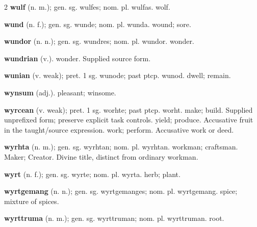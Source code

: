 \begin{multicols*}{2}
\textbf{wulf} (n. m.); gen. sg. wulfes; nom. pl. wulfas. wolf.\par
\textbf{wund} (n. f.); gen. sg. wunde; nom. pl. wunda. wound; sore.\par
\textbf{wundor} (n. n.); gen. sg. wundres; nom. pl. wundor. wonder.\par
\textbf{wundrian} (v.). wonder. Supplied source form.\par
\textbf{wunian} (v. weak); pret. 1 sg. wunode; past ptcp. wunod. dwell; remain.\par
\textbf{wynsum} (adj.). pleasant; winsome.\par
\textbf{wyrcean} (v. weak); pret. 1 sg. worhte; past ptcp. worht. make; build. Supplied unprefixed form; preserve explicit task controls. yield; produce. Accusative fruit in the taught/source expression. work; perform. Accusative work or deed.\par
\textbf{wyrhta} (n. m.); gen. sg. wyrhtan; nom. pl. wyrhtan. workman; craftsman. Maker; Creator. Divine title, distinct from ordinary workman.\par
\textbf{wyrt} (n. f.); gen. sg. wyrte; nom. pl. wyrta. herb; plant.\par
\textbf{wyrtgemang} (n. n.); gen. sg. wyrtgemanges; nom. pl. wyrtgemang. spice; mixture of spices.\par
\textbf{wyrttruma} (n. m.); gen. sg. wyrttruman; nom. pl. wyrttruman. root.\par

\end{multicols*}
